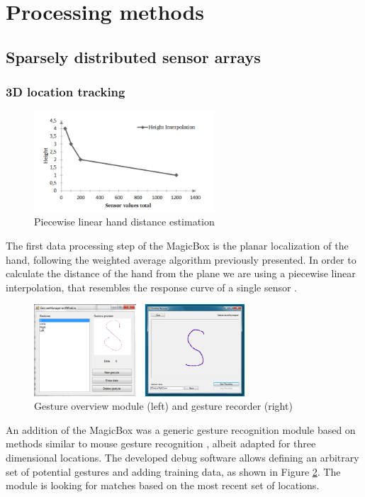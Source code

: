 \section{Processing methods}
\subsection{Sparsely distributed sensor arrays}
\subsubsection{3D location tracking}
 \begin{figure}[h]
\centering
\includegraphics[width=0.6\textwidth]{images/magicbox_data_zaxis}
\caption{Piecewise linear hand distance estimation \cite{Braun2011MultiInputDevice}}
\label{fig:magicbox_data_zaxis}
\end{figure}
The first data processing step of the MagicBox is the planar localization of the hand, following the weighted average algorithm previously presented. In order to calculate the distance of the hand from the plane we are using a piecewise linear interpolation, that resembles the response curve of a single sensor \cite{Braun2011MultiInputDevice}.
\begin{figure}[h]
\centering
\includegraphics[width=0.7\textwidth]{images/magicbox_data_gest}
\caption{Gesture overview module (left) and gesture recorder (right)}
\label{fig:magicbox_data_gest}
\end{figure}
An addition of the MagicBox was a generic gesture recognition module based on methods similar to mouse gesture recognition \cite{braun2013capacitive}, albeit adapted for three dimensional locations. The developed debug software allows defining an arbitrary set of potential gestures and adding training data, as shown in Figure \ref{fig:magicbox_data_gest}. The module is looking for matches based on the most recent set of locations. 
